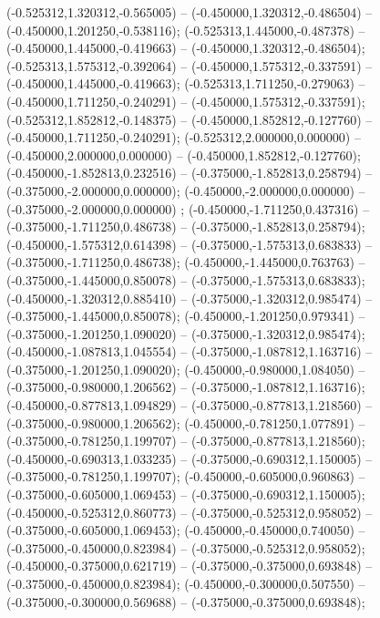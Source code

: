  (-0.525312,1.320312,-0.565005) -- (-0.450000,1.320312,-0.486504) -- (-0.450000,1.201250,-0.538116);
 (-0.525313,1.445000,-0.487378) -- (-0.450000,1.445000,-0.419663) -- (-0.450000,1.320312,-0.486504);
 (-0.525313,1.575312,-0.392064) -- (-0.450000,1.575312,-0.337591) -- (-0.450000,1.445000,-0.419663);
 (-0.525313,1.711250,-0.279063) -- (-0.450000,1.711250,-0.240291) -- (-0.450000,1.575312,-0.337591);
 (-0.525312,1.852812,-0.148375) -- (-0.450000,1.852812,-0.127760) -- (-0.450000,1.711250,-0.240291);
 (-0.525312,2.000000,0.000000) -- (-0.450000,2.000000,0.000000) -- (-0.450000,1.852812,-0.127760);
 (-0.450000,-1.852813,0.232516) -- (-0.375000,-1.852813,0.258794) -- (-0.375000,-2.000000,0.000000);
 (-0.450000,-2.000000,0.000000) -- (-0.375000,-2.000000,0.000000) ;
 (-0.450000,-1.711250,0.437316) -- (-0.375000,-1.711250,0.486738) -- (-0.375000,-1.852813,0.258794);
 (-0.450000,-1.575312,0.614398) -- (-0.375000,-1.575313,0.683833) -- (-0.375000,-1.711250,0.486738);
 (-0.450000,-1.445000,0.763763) -- (-0.375000,-1.445000,0.850078) -- (-0.375000,-1.575313,0.683833);
 (-0.450000,-1.320312,0.885410) -- (-0.375000,-1.320312,0.985474) -- (-0.375000,-1.445000,0.850078);
 (-0.450000,-1.201250,0.979341) -- (-0.375000,-1.201250,1.090020) -- (-0.375000,-1.320312,0.985474);
 (-0.450000,-1.087813,1.045554) -- (-0.375000,-1.087812,1.163716) -- (-0.375000,-1.201250,1.090020);
 (-0.450000,-0.980000,1.084050) -- (-0.375000,-0.980000,1.206562) -- (-0.375000,-1.087812,1.163716);
 (-0.450000,-0.877813,1.094829) -- (-0.375000,-0.877813,1.218560) -- (-0.375000,-0.980000,1.206562);
 (-0.450000,-0.781250,1.077891) -- (-0.375000,-0.781250,1.199707) -- (-0.375000,-0.877813,1.218560);
 (-0.450000,-0.690313,1.033235) -- (-0.375000,-0.690312,1.150005) -- (-0.375000,-0.781250,1.199707);
 (-0.450000,-0.605000,0.960863) -- (-0.375000,-0.605000,1.069453) -- (-0.375000,-0.690312,1.150005);
 (-0.450000,-0.525312,0.860773) -- (-0.375000,-0.525312,0.958052) -- (-0.375000,-0.605000,1.069453);
 (-0.450000,-0.450000,0.740050) -- (-0.375000,-0.450000,0.823984) -- (-0.375000,-0.525312,0.958052);
 (-0.450000,-0.375000,0.621719) -- (-0.375000,-0.375000,0.693848) -- (-0.375000,-0.450000,0.823984);
 (-0.450000,-0.300000,0.507550) -- (-0.375000,-0.300000,0.569688) -- (-0.375000,-0.375000,0.693848);
